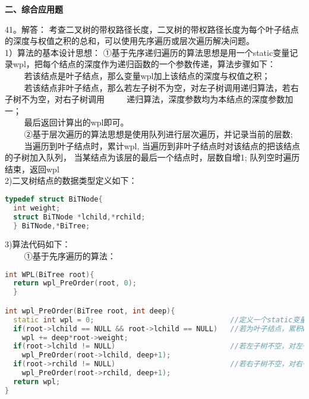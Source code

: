 \textbf{二、综合应用题}

41。解答： 考查二叉树的带权路径长度，二叉树的带权路径长度为每个叶子结点的深度与权值之积的总和，可以使用先序遍历或层次遍历解决问题。 \\

1）算法的基本设计思想： ①基于先序递归遍历的算法思想是用一个static变量记录wpl，把每个结点的深度作为递归函数的一个参数传递，算法步骤如下：  \\
$\qquad$ 若该结点是叶子结点，那么变量wpl加上该结点的深度与权值之积； \\
$\qquad$ 若该结点非叶子结点，那么若左子树不为空，对左子树调用递归算法，若右子树不为空，对右子树调用 $\qquad$ 递归算法，深度参数均为本结点的深度参数加一； \\
$\qquad$ 最后返回计算出的wpl即可。 \\
$\qquad$ ②基于层次遍历的算法思想是使用队列进行层次遍历，并记录当前的层数; \\
$\qquad$ 当遍历到叶子结点时，累计wpl, 当遍历到非叶子结点时对该结点的把该结点的子树加入队列， 当某结点为该层的最后一个结点时，层数自增1; 队列空时遍历结束，返回wpl \\

2)二叉树结点的数据类型定义如下：
\begin{lstlisting}[language=cpp]
typedef struct BiTNode{ 
  int weight; 
  struct BiTNode *lchild,*rchild; 
  } BiTNode,*BiTree;
\end{lstlisting}

3)算法代码如下： \\
$\qquad$ ①基于先序遍历的算法：
\begin{lstlisting}[language=cpp]
int WPL(BiTree root){ 
  return wpl_PreOrder(root, 0); 
  }

int wpl_PreOrder(BiTree root, int deep){ 
  static int wpl = 0;                                //定义一个static变量存储wpl
  if(root->lchild == NULL && root->lchild == NULL)   //若为叶子结点，累积wpl 
    wpl += deep*root->weight;
  if(root->lchild != NULL)                           //若左子树不空，对左子树递归遍历
    wpl_PreOrder(root->lchild, deep+1);
  if(root->rchild != NULL)                           //若右子树不空，对右子树递归遍历
    wpl_PreOrder(root->rchild, deep+1);
  return wpl;
}
\end{lstlisting}

